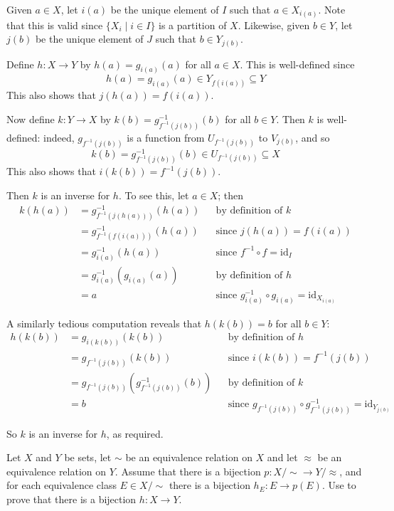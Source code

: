 \begin{cproof}
Given $a \in X$, let $i(a)$ be the unique element of $I$ such that $a \in X_{i(a)}$. Note that this is valid since $\{ X_i \mid i \in I \}$ is a partition of $X$. Likewise, given $b \in Y$, let $j(b)$ be the unique element of $J$ such that $b \in Y_{j(b)}$.

Define $h : X \to Y$ by $h(a) = g_{i(a)}(a)$ for all $a \in X$. This is well-defined since
\[ h(a) = g_{i(a)}(a) \in Y_{f(i(a))} \subseteq Y \]
This also shows that $j(h(a)) = f(i(a))$.

Now define $k : Y \to X$ by $k(b) = g_{f^{-1}(j(b))}^{-1}(b)$ for all $b \in Y$. Then $k$ is well-defined: indeed, $g_{f^{-1}(j(b))}$ is a function from $U_{f^{-1}(j(b))}$ to $V_{j(b)}$, and so
\[ k(b) = g_{f^{-1}(j(b))}^{-1}(b) \in U_{f^{-1}(j(b))} \subseteq X \]
This also shows that $i(k(b)) = f^{-1}(j(b))$.

Then $k$ is an inverse for $h$. To see this, let $a \in X$; then
\begin{align*}
k(h(a)) &= g_{f^{-1}(j(h(a)))}^{-1} (h(a)) && \text{by definition of $k$} \\
&= g_{f^{-1}(f(i(a)))}^{-1} (h(a)) && \text{since $j(h(a)) = f(i(a))$} \\
&= g_{i(a)}^{-1}(h(a)) && \text{since $f^{-1} \circ f = \mathrm{id}_I$} \\
&= g_{i(a)}^{-1}(g_{i(a)}(a)) && \text{by definition of $h$} \\
&= a && \text{since $g_{i(a)}^{-1} \circ g_{i(a)} = \mathrm{id}_{X_{i(a)}}$}
\end{align*}

A similarly tedious computation reveals that $h(k(b)) = b$ for all $b \in Y$:
\begin{align*}
h(k(b)) &= g_{i(k(b))}(k(b)) && \text{by definition of $h$} \\
&= g_{f^{-1}(j(b))}(k(b)) && \text{since $i(k(b)) = f^{-1}(j(b))$} \\
&= g_{f^{-1}(j(b))}(g_{f^{-1}(j(b))}^{-1}(b)) && \text{by definition of $k$} \\
&= b && \text{since $g_{f^{-1}(j(b))} \circ g_{f^{-1}(j(b))}^{-1} = \mathrm{id}_{Y_{j(b)}}$}
\end{align*}

So $k$ is an inverse for $h$, as required.
\end{cproof}

\begin{exercise}
\label{exBijectionOfQuotientsAndClassesInducesBijectionOfSets}
Let $X$ and $Y$ be sets, let $\sim$ be an equivalence relation on $X$ and let $\approx$ be an equivalence relation on $Y$. Assume that there is a bijection $p : X/{\sim} \to Y/{\approx}$, and for each equivalence class $E \in X/{\sim}$ there is a bijection $h_E : E \to p(E)$. Use  to prove that there is a bijection $h : X \to Y$.
\end{exercise}

